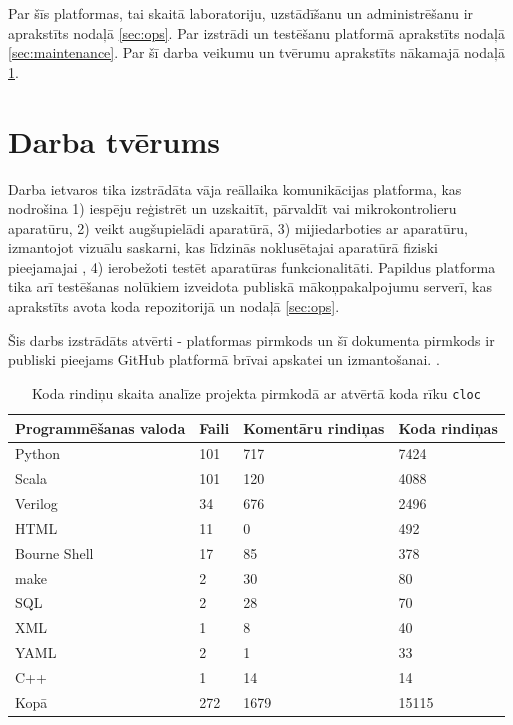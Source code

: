 Par šīs platformas, tai skaitā  laboratoriju,
uzstādīšanu un administrēšanu ir aprakstīts nodaļā \ref{sec:ops}. Par
 izstrādi un testēšanu platformā
aprakstīts nodaļā \ref{sec:maintenance}. Par šī darba veikumu un tvērumu
aprakstīts nākamajā nodaļā \ref{sec:scope}.

\section{Darba tvērums}
\label{sec:scope}

Darba ietvaros tika izstrādāta vāja reāllaika komunikācijas platforma, kas
nodrošina 1) iespēju reģistrēt un uzskaitīt, pārvaldīt  vai mikrokontrolieru aparatūru, 2) veikt
 augšupielādi aparatūrā, 3) mijiedarboties
ar aparatūru, izmantojot vizuālu saskarni, kas līdzinās noklusētajai aparatūrā
fiziski pieejamajai , 4) ierobežoti testēt
aparatūras funkcionalitāti. Papildus platforma tika arī testēšanas nolūkiem
izveidota publiskā mākoņpakalpojumu serverī, kas aprakstīts avota koda
repozitorijā un nodaļā \ref{sec:ops}. \cite{VeinbahsKrisjanisTestbed}
\cite{VeinbahsKrisjanisProduction}

Šis darbs izstrādāts atvērti - platformas pirmkods un šī dokumenta pirmkods ir
publiski pieejams GitHub platformā brīvai apskatei un izmantošanai.
\cite{VeinbahsKrisjanisTestbed} \cite{VeinbahsKrisjanisThesis}.

\begin{table}[H]
    \begin{tabular}{ |p{3cm}|p{3cm}|p{3cm}|p{3cm}| }
    \hline
    Programmēšanas valoda & Faili & Komentāru rindiņas & Koda rindiņas \\
    \hline
    Python          & 101   & 717   & 7424  \\
    Scala           & 101   & 120   & 4088  \\
    Verilog         & 34    & 676   & 2496  \\
    HTML            & 11    & 0     & 492   \\
    Bourne Shell    & 17    & 85    & 378   \\
    make            & 2     & 30    & 80    \\
    SQL             & 2     & 28    & 70    \\
    XML             & 1     & 8     & 40    \\
    YAML            & 2     & 1     & 33    \\
    C++             & 1     & 14    & 14    \\
    \hhline{|=|=|=|=|}
    Kopā & 272 & 1679 & 15115\\
    \hline
    \end{tabular}
    \centering
    \captionsetup{justification=centering}
    \caption{Koda rindiņu skaita analīze projekta pirmkodā ar atvērtā koda rīku \lstinline!cloc!}
    \label{table:cloc}
\end{table}

